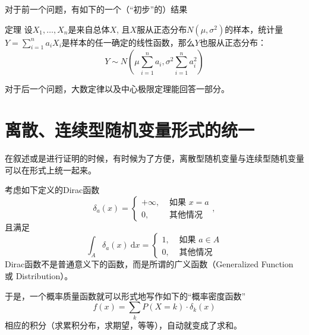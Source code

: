 \begin{frame}

对于前一个问题，有如下的一个（``初步''的）结果
\begin{block}{定理}
设$X_1,\ldots,X_n$是来自总体$X$, 且$X$服从正态分布$N(\mu, \sigma^2)$的样本，统计量$Y = \sum\limits_{i=1}^n a_iX_i$是样本的任一确定的线性函数，那么$Y$也服从正态分布：
\[Y \sim N \left( \mu \sum\limits_{i=1}^n a_i, \sigma^2 \sum\limits_{i=1}^n a_i^2 \right)\]
\end{block}

\vspace{1em}
对于后一个问题，大数定律以及中心极限定理能回答一部分。

\end{frame}


\section{离散、连续型随机变量形式的统一}


\begin{frame}

在叙述或是进行证明的时候，有时候为了方便，离散型随机变量与连续型随机变量可以在形式上统一起来。

\vspace{1em}

考虑如下定义的Dirac函数
\[\delta_a(x) = \begin{cases}
+\infty, & \text{ 如果 } x = a \\
0, & \text{ 其他情况 }
\end{cases},\]
且满足
\[\int_{A} \delta_a(x) ~ \mathrm{d}x = \begin{cases}
1, & \text{ 如果 } a \in A \\
0, & \text{ 其他情况 }
\end{cases}\]
Dirac函数不是普通意义下的函数，而是所谓的广义函数（Generalized Function 或 Distribution）。

\end{frame}


\begin{frame}

于是，一个概率质量函数就可以形式地写作如下的``概率密度函数''
\[f(x) = \sum\limits_k P(X=k) \cdot \delta_k(x)\]
相应的积分（求累积分布，求期望，等等），自动就变成了求和。

\end{frame}

